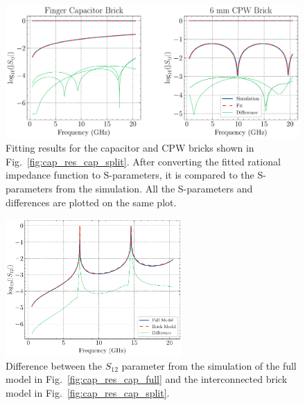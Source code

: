 \begin{figure}[!t]
    \centering
    \includegraphics[width=\textwidth]{figures/cap_res_fit.pdf}
    \caption{Fitting results for the capacitor and CPW bricks shown in Fig.\ \ref{fig:cap_res_cap_split}. After converting the fitted rational impedance function to S-parameters, it is compared to the S-parameters from the simulation. All the S-parameters and differences are plotted on the same plot.}
    \label{fig:cap_res_fit}
\end{figure}

\begin{figure}[!h]
    \centering
    \includegraphics[width=0.6\textwidth]{figures/full_vs_brick.pdf}
    \caption{Difference between the $S_{12}$ parameter from the simulation of the full model in Fig.\ \ref{fig:cap_res_cap_full} and the interconnected brick model in Fig.\ \ref{fig:cap_res_cap_split}.}
    \label{fig:full_vs_brick}
\end{figure}

